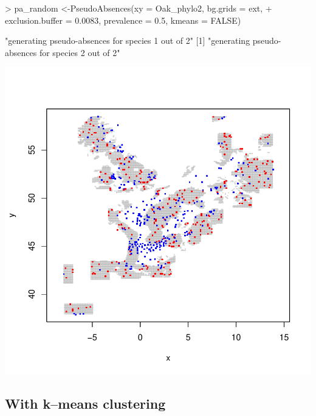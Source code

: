 \documentclass[10pt,a4paper]{report}
\begin{document}
\begin{Schunk}
\begin{Sinput}
> pa_random <-PseudoAbsences(xy = Oak_phylo2, bg.grids = ext, 
+ 	exclusion.buffer = 0.0083, prevalence = 0.5, kmeans = FALSE)
\end{Sinput}
\begin{Soutput}
[1] "generating pseudo-absences for species 1 out of 2"
[1] "generating pseudo-absences for species 2 out of 2"
\end{Soutput}
\end{Schunk}
\includegraphics{mopa-mopa9}

\subsection{With k--means clustering}
\end{document}
